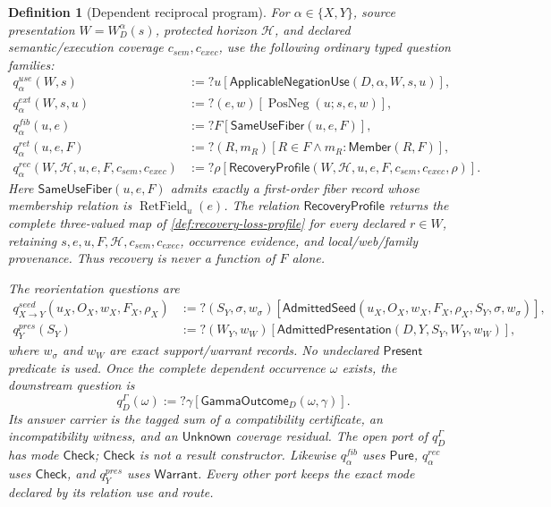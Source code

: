 \documentclass[11pt,oneside]{article}
\newtheorem{definition}{Definition}[section]
\newcommand{\RetField}{\operatorname{RetField}}
\newcommand{\PosNeg}{\operatorname{PosNeg}}
\begin{document}
\begin{definition}[Dependent reciprocal program]\label{def:recip-program}
For \(\alpha\in\{X,Y\}\), source presentation \(W=W_D^\alpha(s)\), protected horizon
\(\mathcal H\), and declared semantic/execution coverage \(c_{sem},c_{exec}\), use the following
ordinary typed question families:
\[
\begin{aligned}
q^{use}_\alpha(W,s)
&:=?u[\mathsf{ApplicableNegationUse}(D,\alpha,W,s,u)],\\
q^{ext}_\alpha(W,s,u)
&:=?(e,w)[\PosNeg(u;s,e,w)],\\
q^{fib}_\alpha(u,e)
&:=?F[\mathsf{SameUseFiber}(u,e,F)],\\
q^{ret}_\alpha(u,e,F)
&:=?(R,m_R)[R\in F\land m_R:\mathsf{Member}(R,F)],\\
q^{rec}_\alpha(W,\mathcal H,u,e,F,c_{sem},c_{exec})
&:=?\rho[\mathsf{RecoveryProfile}(W,\mathcal H,u,e,F,c_{sem},c_{exec},\rho)].
\end{aligned}
\]
Here \(\mathsf{SameUseFiber}(u,e,F)\) admits exactly a first-order fiber record whose membership
relation is \(\RetField_u(e)\).  The relation \(\mathsf{RecoveryProfile}\) returns the complete
three-valued map of \cref{def:recovery-loss-profile} for every declared \(r\in W\), retaining
\(s,e,u,F,\mathcal H,c_{sem},c_{exec}\), occurrence evidence, and local/web/family provenance.
Thus recovery is never a function of \(F\) alone.

The reorientation questions are
\[
\begin{aligned}
q^{seed}_{X\to Y}(u_X,O_X,w_X,F_X,\rho_X)
&:=?(S_Y,\sigma,w_\sigma)
  [\mathsf{AdmittedSeed}(u_X,O_X,w_X,F_X,\rho_X,S_Y,\sigma,w_\sigma)],\\
q^{pres}_Y(S_Y)
&:=?(W_Y,w_W)[\mathsf{AdmittedPresentation}(D,Y,S_Y,W_Y,w_W)],
\end{aligned}
\]
where \(w_\sigma\) and \(w_W\) are exact support/warrant records.  No undeclared
\(\mathsf{Present}\) predicate is used.  Once the complete dependent occurrence \(\omega\) exists,
the downstream question is
\[
\boxed{
q^\Gamma_D(\omega)
:=?\gamma[\mathsf{GammaOutcome}_D(\omega,\gamma)].
}
\]
Its answer carrier is the tagged sum of a compatibility certificate, an incompatibility witness,
and an \(\mathsf{Unknown}\) coverage residual.  The open port of \(q^\Gamma_D\) has mode
\(\mathsf{Check}\); \(\mathsf{Check}\) is not a result constructor.  Likewise \(q^{fib}_\alpha\)
uses \(\mathsf{Pure}\), \(q^{rec}_\alpha\) uses \(\mathsf{Check}\), and
\(q^{pres}_Y\) uses \(\mathsf{Warrant}\).  Every other port keeps the exact mode declared by its
relation use and route.


\end{definition}
\end{document}
